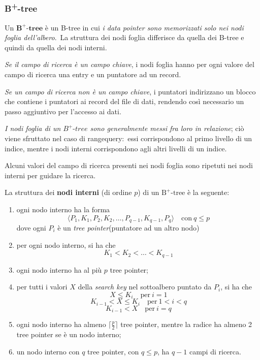\subsubsection{B\textsuperscript{+}-tree}

Un $\mathrm{\mathbf{B^+\textrm{-}tree}}$ è un B-tree in cui \textit{i data pointer sono memorizzati solo nei nodi foglia dell'albero}.\
La struttura dei nodi foglia differisce da quella dei B-tree e quindi da quella dei nodi interni.\

\textit{Se il campo di ricerca è un campo chiave}, i nodi foglia hanno per ogni valore del campo di ricerca una entry e un puntatore ad un record.\

\textit{Se un campo di ricerca non è un campo chiave}, i puntatori indirizzano un blocco che contiene i puntatori ai record del file di dati, rendendo così necessario un passo aggiuntivo per l'accesso ai dati.\

\textit{I nodi foglia di un $B^+\textrm{-}tree$ sono generalmente messi fra loro in relazione}; ciò viene sfruttato nel caso di rangequery:\ essi corrispondono al primo livello di un indice, mentre i nodi interni corrispondono agli altri livelli di un indice.\

Alcuni valori del campo di ricerca presenti nei nodi foglia sono ripetuti nei nodi interni per guidare la ricerca.

\vspace{12pt}
\noindent La struttura dei \textbf{nodi interni} (di ordine $p$) di un $\mathrm{B^+\textrm{-}tree}$ è la seguente:
\begin{enumerate}
	\item ogni nodo interno ha la forma \[\langle P_1, K_1, P_2, K_2, \dots, P_{q-1}, K_{q-1}, P_q \rangle \quad \mathrm{con}\ q \leq p\] dove ogni $P_i$ è un \textit{tree pointer}(puntatore ad un altro nodo)
	\item per ogni nodo interno, si ha che \[K_1 < K_2 < \dots < K_{q-1}\]
	\item ogni nodo interno ha al più $p$ tree pointer;
	\item per tutti i valori $X$ della \textit{search key} nel sottoalbero puntato da $P_i$, si ha che \[X \leq K_i\quad\mathrm{per}\ i = 1\]\[K_{i-1} < X \leq K_i\quad\mathrm{per}\ 1 < i < q\]\[K_{i-1} < X\quad\mathrm{per}\ i = q\]
	\item ogni nodo interno ha almeno $\lceil \frac{p}{2}\rceil$ tree pointer, mentre la radice ha almeno 2 tree pointer se è un nodo interno;
	\item un nodo interno con $q$ tree pointer, con $q \leq p$, ha $q-1$ campi di ricerca.
\end{enumerate}

